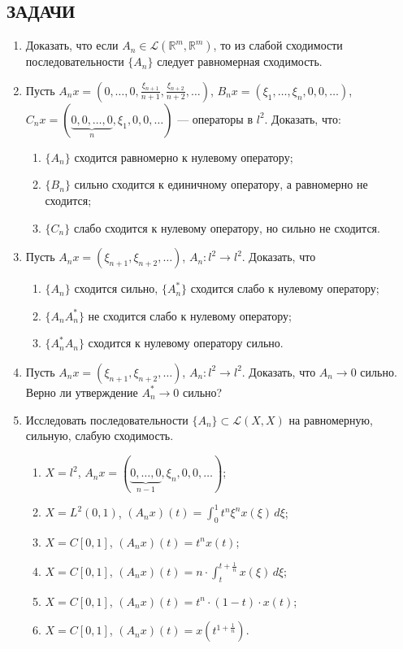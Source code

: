 \documentclass[12pt,a4paper]{article}
\begin{document}
\subsection*{ЗАДАЧИ}
\begin{enumerate}
\item Доказать, что если $A_{n} \in \mathcal{L}(\mathbb{R}^{m},\mathbb{R}^{m})$, то из слабой сходимости последовательности $\{A_{n}\}$ следует равномерная сходимость.

\item Пусть $A_{n}x = (0, \dots, 0, \frac{\xi_{n+1}}{n+1}, \frac{\xi_{n+2}}{n+2}, \dots)$, $B_{n}x = (\xi_{1}, \dots, \xi_{n}, 0, 0, \dots)$, $C_{n}x = (\underbrace{0, 0, \dots, 0}_{n}, \xi_{1}, 0, 0, \dots)$ — операторы в $l^{2}$. Доказать, что:
\begin{enumerate}[label=\alph*)]
\item $\{A_{n}\}$ сходится равномерно к нулевому оператору;
\item $\{B_{n}\}$ сильно сходится к единичному оператору, а равномерно не сходится;
\item $\{C_{n}\}$ слабо сходится к нулевому оператору, но сильно не сходится.
\end{enumerate}

\item Пусть $A_{n}x = (\xi_{n+1}, \xi_{n+2}, \dots)$, $A_{n}: l^{2} \rightarrow l^{2}$. Доказать, что
\begin{enumerate}[label=\alph*)]
\item $\{A_{n}\}$ сходится сильно, $\{A_{n}^{*}\}$ сходится слабо к нулевому оператору;
\item $\{A_{n}A_{n}^{*}\}$ не сходится слабо к нулевому оператору;
\item $\{A_{n}^{*}A_{n}\}$ сходится к нулевому оператору сильно.
\end{enumerate}

\item Пусть $A_{n}x = (\xi_{n+1}, \xi_{n+2}, \dots)$, $A_{n}: l^{2} \rightarrow l^{2}$. Доказать, что $A_{n} \rightarrow 0$ сильно. Верно ли утверждение $A_{n}^{*} \rightarrow 0$ сильно?

\item Исследовать последовательности $\{A_{n}\} \subset \mathcal{L}(X,X)$ на равномерную, сильную, слабую сходимость.
\begin{enumerate}[label=\alph*)]
\item $X = l^{2}$, $A_{n}x = (\underbrace{0, \dots, 0}_{n-1}, \xi_{n}, 0, 0, \dots)$;
\item $X = L^{2}(0,1)$, $(A_{n}x)(t) = \int_{0}^{1} t^{n}\xi^{n}x(\xi) \, d\xi$;
\item $X = C[0,1]$, $(A_{n}x)(t) = t^{n}x(t)$;
\item $X = C[0,1]$, $(A_{n}x)(t) = n \cdot \int_{t}^{t+\frac{1}{n}} x(\xi) \, d\xi$;
\item $X = C[0,1]$, $(A_{n}x)(t) = t^{n} \cdot (1-t) \cdot x(t)$;
\item $X = C[0,1]$, $(A_{n}x)(t) = x(t^{1+\frac{1}{n}})$.
\end{enumerate}


\end{enumerate}
\end{document}

